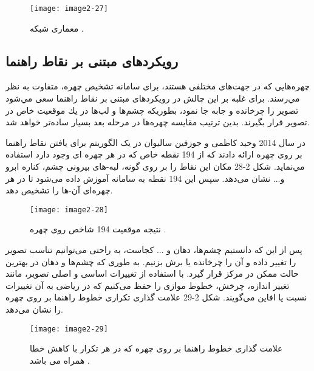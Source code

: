  \begin{figure}[h]
\centering
  \texttt{[image: image2-27]}
  \caption{معماری شبکه  \cite{ref1}.}
  \label{image2-27}
\end{figure}

 \subsection{رویکردهای مبتنی بر نقاط راهنما} 
چهره‌هايى كه در جهت‌هاى مختلفى هستند، براى سامانه تشخیص چهره، متفاوت به نظر مي‌رسند. براى غلبه بر اين چالش در رویکردهای مبتنی بر نقاط راهنما سعى مي‌شود تصوير را چرخانده و جابه جا نمود، بطوريكه چشم‌ها و لب‌ها در يك موقعيت خاص در تصوير قرار بگیرند. بدین ترتیب مقايسه چهره‌ها در مرحله بعد بسيار ساده‌تر خواهد شد.

\noindent 
در سال 2014 وحيد كاظمى و جوزفين ساليوان در \cite{6909637} یک الگوریتم برای یافتن نقاط راهنما  بر روی چهره ارائه دادند كه از 194 نقطه خاص كه در هر چهره اى وجود دارد استفاده مي‌نماید. شکل 2-28 مکان این نقاط را بر روی گونه، لبه-هاى بیرونی چشم، كناره ابرو و... نشان می‌دهد. سپس اين 194 نقطه به سامانه آموزش داده می‌شود تا در هر چهره‌اى آن-ها را تشخيص دهد. 
\begin{figure}[h]
\centering
  \texttt{[image: image2-28]}
  \caption{نتیجه موقعیت 194 شاخص روی چهره \cite{ref1}.}
  \label{image2-28}
\end{figure}
\noindent
پس از این که دانستیم چشم‌ها، دهان و ... کجاست، به راحتی می‌توانیم تناسب تصویر را تغییر داده و آن را چرخانده یا برش بزنیم. به طوری که چشم‌ها و دهان در بهترین حالت ممکن در مرکز قرار گیرد. با استفاده از تغییرات اساسی و اصلی تصویر، مانند تغییر اندازه، چرخش، خطوط موازی را حفظ می‌کنیم که در ریاضی به آن تغییرات نسبت یا افاین می‌گویند. شکل 2-29 علامت گذاری تکراری خطوط راهنما بر روی چهره را نشان می‌دهد. 
\begin{figure}[h]
\centering
  \texttt{[image: image2-29]}
  \caption{علامت گذاری خطوط راهنما بر روی چهره که در هر تکرار با کاهش خطا همراه می باشد \cite{ref1}.}
  \label{image2-29}
\end{figure}

